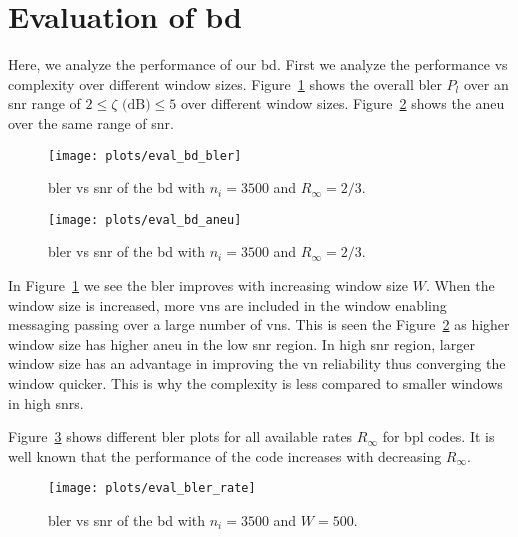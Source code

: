 \section{Evaluation of \acrfull{bd}}
Here, we analyze the performance of our \gls{bd}. First we analyze the performance vs complexity over different window sizes. Figure~\ref{fig:eval_bd_bler} shows the overall \gls{bler} $P_l$ over an \gls{snr} range of $2\leq\zeta\text{ (dB)}\leq 5$ over different window sizes. Figure~\ref{fig:eval_bd_aneu} shows the \gls{aneu} over the same range of \gls{snr}.
\begin{figure}[htbp]
  \centering
  \texttt{[image: plots/eval\_bd\_bler]}
  \caption{\gls{bler} vs \gls{snr} of the \acrfull{bd} with $n_i=3500$ and $R_\infty=2/3$.}
  \label{fig:eval_bd_bler}
\end{figure}
\begin{figure}[htbp]
   \centering
  \texttt{[image: plots/eval\_bd\_aneu]}
  \caption{\gls{bler} vs \gls{snr} of the \acrfull{bd} with $n_i=3500$ and $R_\infty=2/3$.}
  \label{fig:eval_bd_aneu}
\end{figure}

In Figure~\ref{fig:eval_bd_bler} we see the \gls{bler} improves with increasing window size $W$. When the window size is increased, more \glspl{vn} are included in the window enabling messaging passing over a large number of \glspl{vn}. This is seen the Figure~\ref{fig:eval_bd_aneu} as higher window size has higher \gls{aneu} in the low \gls{snr} region. In high \gls{snr} region, larger window size has an advantage in improving the \gls{vn} reliability thus converging the window quicker. This is why the complexity is less compared to smaller windows in high \glspl{snr}.

Figure~\ref{fig:eval_bler_rate} shows different \gls{bler} plots for all available rates $R_\infty$ for \gls{bpl} codes. It is well known that the performance of the code increases with decreasing $R_\infty$.
\begin{figure}[htbp]
  \centering
  \texttt{[image: plots/eval\_bler\_rate]}
  \caption{\gls{bler} vs \gls{snr} of the \acrfull{bd} with $n_i=3500$ and $W=500$.}
  \label{fig:eval_bler_rate}
\end{figure}

